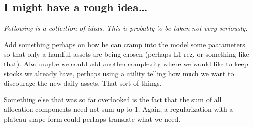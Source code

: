 \subsection*{I might have a rough idea\dots}

\textit{Following is a collection of ideas. This is probably to be taken not very seriously.}

Add something perhaps on how he can cramp into the model some paarameters so that only a
handful assets are being chosen (perhaps L1 reg. or something like that).  Also maybe we
could add another complexity where we would like to keep stocks we already have, perhaps
using a utility telling how much we want to discourage the new daily assets. That sort of
things.

Something else that was so far overlooked is the fact that the sum of all allocation
components need not sum up to 1. Again, a regularization with a plateau shape form could
perhaps translate what we need.
